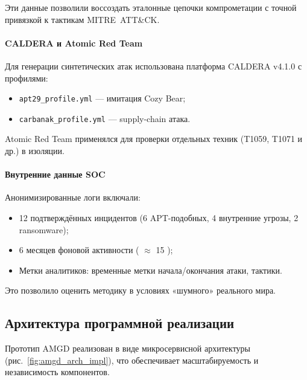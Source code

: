 Эти данные позволили воссоздать эталонные цепочки компрометации с точной привязкой к тактикам MITRE~ATT\&CK.

\paragraph{CALDERA и Atomic Red Team}
Для генерации синтетических атак использована платформа CALDERA v4.1.0 с профилями:
\begin{itemize}
    \item \texttt{apt29\_profile.yml} — имитация Cozy Bear;
    \item \texttt{carbanak\_profile.yml} — supply-chain атака.
\end{itemize}

Atomic Red Team применялся для проверки отдельных техник (T1059, T1071 и др.) в изоляции.

\paragraph{Внутренние данные SOC}
Анонимизированные логи включали:
\begin{itemize}
    \item 12 подтверждённых инцидентов (6 APT-подобных, 4 внутренние угрозы, 2 ransomware);
    \item 6 месяцев фоновой активности ( $\approx$ 15 );
    \item Метки аналитиков: временные метки начала/окончания атаки, тактики.
\end{itemize}

Это позволило оценить методику в условиях «шумного» реального мира.

\subsection{Архитектура программной реализации}

Прототип AMGD реализован в виде микросервисной архитектуры (рис.~\ref{fig:amgd_arch_impl}), что обеспечивает масштабируемость и независимость компонентов.

